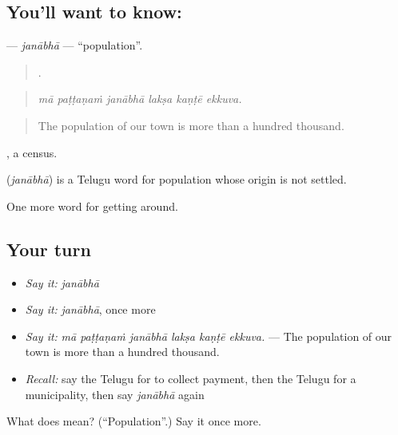 \subsection*{You'll want to know: }
\textbf{} — \emph{janābhā} — \textquotedblleft{}population\textquotedblright{}.

\begin{quote}
     .
\end{quote}

\begin{quote}
\emph{mā paṭṭaṇaṁ janābhā lakṣa kaṇṭē ekkuva.}
\end{quote}

\begin{quote}
The population of our town is more than a hundred thousand.
\end{quote}

 , a census.

\begin{cousinweb}
\textbf{} (\emph{janābhā}) is a Telugu word for population whose origin is not settled.
\end{cousinweb}

\begin{grammarlens}[title={What you've built}]
One more word for getting around.
\end{grammarlens}

\subsection*{Your turn}
\begin{itemize}
\raggedright
  \item \emph{Say it:} \emph{janābhā}
  \item \emph{Say it:} \emph{janābhā}, once more
  \item \emph{Say it:} \emph{mā paṭṭaṇaṁ janābhā lakṣa kaṇṭē ekkuva.} — The population of our town is more than a hundred thousand.
  \item \emph{Recall:} say the Telugu for to collect payment, then the Telugu for a municipality, then say \emph{janābhā} again
\end{itemize}

\begin{tcolorbox}[breakable,colback=teal!4,colframe=teal!35!black,title={Before you move on}]
What does  mean? (\textquotedblleft{}Population\textquotedblright{}.) Say it once more.
\end{tcolorbox}
